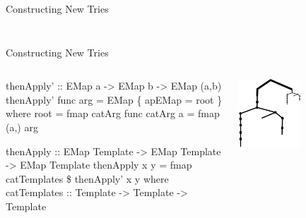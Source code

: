 \documentclass{beamer}
\begin{document}
\begin{frame}[fragile]{Constructing New Tries}
\begin{columns}
\begin{column}{0.5\textwidth}
\begin{flushright}
{          }
        \end{flushright}
      \end{column}
    \end{columns}
  \end{frame}

  \begin{frame}[fragile, t]{Constructing New Tries}
    \begin{columns}
      \begin{column}{0.5\textwidth}
\begin{semiverbatim}
thenApply' :: EMap a -> EMap b -> EMap (a,b)
thenApply' func arg = EMap \{ apEMap = root \}
  where {
    root = fmap catArg func
    catArg a = fmap (a,) arg
}

thenApply :: EMap Template 
  -> EMap Template -> EMap Template
thenApply x y 
  = fmap catTemplates \$ thenApply' x y
  where
    catTemplates :: Template -> Template
      -> Template
\end{semiverbatim}
      \end{column}
      \begin{column}{0.5\textwidth}  %
        \begin{flushright}
          \includegraphics[width=0.5\textwidth]{cyclicLevel01}
        \end{flushright}
      \end{column}
    \end{columns}
  \end{frame}
\end{document}
